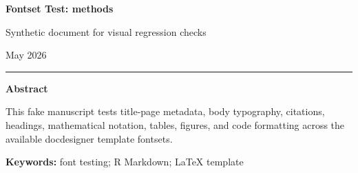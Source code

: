 \documentclass[12pt]{article}
\newif\ifdocdesigneranon
\begin{document}
\begin{titlepage}
\thispagestyle{empty}
\vspace*{0.12\textheight}
\begin{center}
\begin{singlespace}

{\LARGE\bfseries Fontset Test: methods\par}

\vspace{0.35em}
{\large Synthetic document for visual regression checks\par}

\vspace{2.2em}

\docdesignerauthorblock

\par\vspace{1.5\baselineskip}
\docdesignerseriesblock

\ifdocdesigneranon\else
\vspace{0.35em}
{\small May 2026}\par
\fi

\vspace{2.2\baselineskip}
\noindent\rule{0.35\textwidth}{0.4pt}\par
\vspace{0.65em}
\begin{minipage}{0.78\textwidth}
\small\singlespacing
\textbf{Abstract}\par\vspace{0.3em}
This fake manuscript tests title-page metadata, body typography,
citations, headings, mathematical notation, tables, figures, and code
formatting across the available docdesigner template fontsets.
\par\vspace{0.6em}
\textbf{Keywords:} font testing; R Markdown; LaTeX template
\end{minipage}

\end{singlespace}
\end{center}
\vfill
\end{titlepage}
\else
\end{document}
